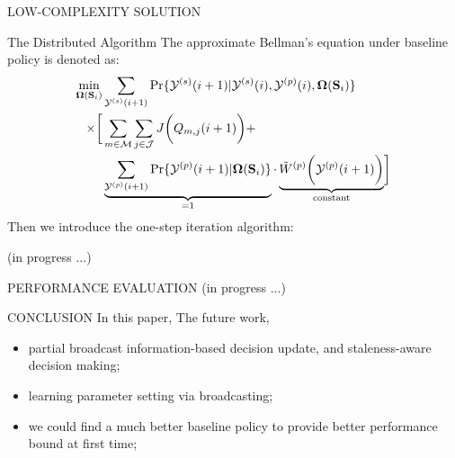 \documentclass[10pt, conference, letterpaper]{IEEEtran}
\renewcommand{\vec}{\mathbf}
\DeclarePairedDelimiter{\Paren}{\bigg(}{\bigg)}
\DeclarePairedDelimiter{\Bracket}{\bigg[}{\bigg]}
\newcommand{\esSet}{\mathcal{M}}
\newcommand{\jSpace}{\mathcal{J}}
\newcommand{\Stat}{\mathbf{S}}
\newcommand{\Obsv}{\mathcal{Y}}
\newcommand{\Policy}{\boldsymbol{\Omega}}
\newcommand{\BPolicy}{\Policy} %
\begin{document}
\begin{section}{LOW-COMPLEXITY SOLUTION}
        \begin{subsection}{The Distributed Algorithm}
            The approximate Bellman's equation under baseline policy is denoted as:
            \begin{align}
                \min_{\BPolicy(\Stat_i)}& \sum_{\Obsv^{(s)}(i+1)} \Pr\{\Obsv^{(s)}(i+1)|\Obsv^{(s)}(i), \Obsv^{(p)}(i), \BPolicy(\Stat_i)\}
                \nonumber\\
                \times \Bracket{
                    & \sum_{m\in\esSet}\sum_{j\in\jSpace} J\Paren{Q_{m,j}(i+1)}
                    +
                    \nonumber\\
                    & \underbrace{\sum_{\Obsv^{(p)}(i+1)} \Pr\{\Obsv^{(p)}(i+1)|\BPolicy(\Stat_i)\}}_{\text{=1}}
                    \cdot \underbrace{\tilde{W}^{(p)} \Paren{\Obsv^{(p)}(i+1)}}_{\text{constant}}
                } 
            \end{align}
            Then we introduce the one-step iteration algorithm:
            \begin{algorithm}[H]
                \caption{Distributed Algorithm for $k$-th AP}
                \begin{algorithmic}
                    \WHILE{\TRUE}
                        \STATE (in progress ...)
                    \ENDWHILE
                \end{algorithmic}
            \end{algorithm}
        \end{subsection}
        
    \end{section}

    \begin{section}{PERFORMANCE EVALUATION}
        \label{sec:evaluation}
        (in progress ...)
    \end{section}

    \begin{section}{CONCLUSION}
        \label{sec:conclusion}
        In this paper,
        The future work,
        \begin{itemize}
            \item partial broadcast information-based decision update, and staleness-aware decision making;
            \item learning parameter setting via broadcasting;
            \item we could find a much better baseline policy to provide better performance bound at first time;
        \end{itemize}
    \end{section}
    
\end{document}
